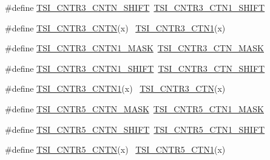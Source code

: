 \begin{DoxyCompactItemize}
\item 
\#define \hyperlink{group___backward___compatibility___symbols_gaa0218acbea89324b8af5644f7802ba5b}{T\+S\+I\+\_\+\+C\+N\+T\+R3\+\_\+\+C\+N\+T\+N\+\_\+\+S\+H\+I\+FT}~\hyperlink{group___t_s_i___register___masks_ga40857a8de39e7f24268f2209546b7d92}{T\+S\+I\+\_\+\+C\+N\+T\+R3\+\_\+\+C\+T\+N1\+\_\+\+S\+H\+I\+FT}
\item 
\#define \hyperlink{group___backward___compatibility___symbols_ga9fe4f79f13e703e7d3a4d3de31b58d24}{T\+S\+I\+\_\+\+C\+N\+T\+R3\+\_\+\+C\+N\+TN}(x)                                            ~\hyperlink{group___t_s_i___register___masks_ga1e6f0a4e5556aaf6a47e0c4b09abcdf8}{T\+S\+I\+\_\+\+C\+N\+T\+R3\+\_\+\+C\+T\+N1}(x)
\item 
\#define \hyperlink{group___backward___compatibility___symbols_ga19f93337e80bef020791f08390310957}{T\+S\+I\+\_\+\+C\+N\+T\+R3\+\_\+\+C\+N\+T\+N1\+\_\+\+M\+A\+SK}~\hyperlink{group___t_s_i___register___masks_ga706c452af2d87895eec6b24787418763}{T\+S\+I\+\_\+\+C\+N\+T\+R3\+\_\+\+C\+T\+N\+\_\+\+M\+A\+SK}
\item 
\#define \hyperlink{group___backward___compatibility___symbols_ga542eebc240d2d3d4a6b2ba0e6b00ee31}{T\+S\+I\+\_\+\+C\+N\+T\+R3\+\_\+\+C\+N\+T\+N1\+\_\+\+S\+H\+I\+FT}~\hyperlink{group___t_s_i___register___masks_ga7b5cdf80f7cb214a07cc1a08f84dafde}{T\+S\+I\+\_\+\+C\+N\+T\+R3\+\_\+\+C\+T\+N\+\_\+\+S\+H\+I\+FT}
\item 
\#define \hyperlink{group___backward___compatibility___symbols_ga065e047d3b2ac1f7169473945d95b1d9}{T\+S\+I\+\_\+\+C\+N\+T\+R3\+\_\+\+C\+N\+T\+N1}(x)                                          ~\hyperlink{group___t_s_i___register___masks_ga820fd10f31f0e10f48840243bbc1fe68}{T\+S\+I\+\_\+\+C\+N\+T\+R3\+\_\+\+C\+TN}(x)
\item 
\#define \hyperlink{group___backward___compatibility___symbols_ga6b0dc1f7242040a4efcc1b53dda88ba2}{T\+S\+I\+\_\+\+C\+N\+T\+R5\+\_\+\+C\+N\+T\+N\+\_\+\+M\+A\+SK}~\hyperlink{group___t_s_i___register___masks_ga7c016e770c1a5682417e7f7df4887663}{T\+S\+I\+\_\+\+C\+N\+T\+R5\+\_\+\+C\+T\+N1\+\_\+\+M\+A\+SK}
\item 
\#define \hyperlink{group___backward___compatibility___symbols_gae472c5089432c1fe0ef4a28d0f3d0eda}{T\+S\+I\+\_\+\+C\+N\+T\+R5\+\_\+\+C\+N\+T\+N\+\_\+\+S\+H\+I\+FT}~\hyperlink{group___t_s_i___register___masks_ga1aa3ace6f56df71e799b8c737559e2ab}{T\+S\+I\+\_\+\+C\+N\+T\+R5\+\_\+\+C\+T\+N1\+\_\+\+S\+H\+I\+FT}
\item 
\#define \hyperlink{group___backward___compatibility___symbols_gacd01a1a4cd3a313fb88e62969a48a1e7}{T\+S\+I\+\_\+\+C\+N\+T\+R5\+\_\+\+C\+N\+TN}(x)                                            ~\hyperlink{group___t_s_i___register___masks_ga80141145e6a5e1ff736afd93146f5af2}{T\+S\+I\+\_\+\+C\+N\+T\+R5\+\_\+\+C\+T\+N1}(x)

\end{DoxyCompactItemize}

